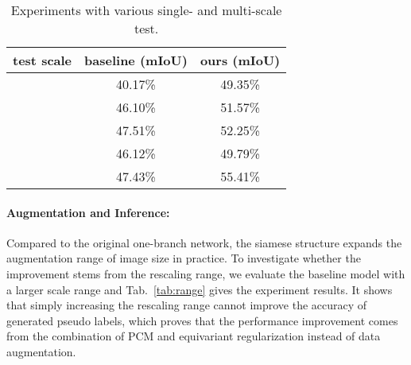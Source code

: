 \documentclass[10pt,twocolumn,letterpaper]{article}
\begin{document}
	\begin{table}[tbp]
		\centering
		\begin{tabular}{l|c|c}
			\hline
			test scale & baseline (mIoU) & ours (mIoU)\\
			\hline
			 & 40.17\% & 49.35\%\\
			 & 46.10\% & 51.57\%\\
			 & 47.51\% & 52.25\%\\
			 & 46.12\% & 49.79\%\\
			\hline
			 & 47.43\% & 55.41\%\\
			\hline
		\end{tabular}
		\caption{Experiments with various single- and multi-scale test.}
		\label{tab:singlemultiscale}
\end{table}
\paragraph{Augmentation and Inference:}
	Compared to the original one-branch network, the siamese structure expands the augmentation range of image size in practice. To investigate whether the improvement stems from the rescaling range, we evaluate the baseline model with a larger scale range and Tab.~\ref{tab:range} gives the experiment results. It shows that simply increasing the rescaling range cannot improve the accuracy of generated pseudo labels, which proves that the performance improvement comes from the combination of PCM and equivariant regularization instead of data augmentation.
	
\end{document}

